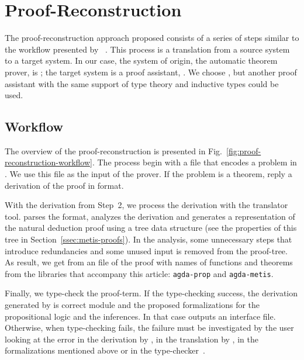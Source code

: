 \documentclass[../main.tex]{subfiles}
\begin{document}

\section{Proof-Reconstruction}
\label{sec:proof-reconstruction}

The proof-reconstruction approach proposed consists of a series
of steps similar to the workflow presented by
\citeauthor{sultana2015}~\cite{sultana2015}.
This process is a translation from a source
system to a target system. In our case, the system of origin, the
automatic theorem prover, is \Metis; the target system is a proof
assistant, \Agda. We choose \Agda, but another proof assistant with the
same support of type theory and inductive types could be used.

\subsection{Workflow}
\label{ssec:workflow}


The overview of the proof-reconstruction is presented in
Fig.~\ref{fig:proof-reconstruction-workflow}. The process begin with
a \TPTP file that encodes a problem in \CPL. We use this file as the
input of the \Metis prover. If the problem is a theorem, \Metis
reply a derivation of the proof in \TSTP format.

With the \TSTP derivation from Step~2, we process the derivation with the
\Athena translator tool.
\Athena parses the \TSTP format, analyzes the
derivation and generates a representation of the natural deduction
proof using a tree data structure (see the properties
of this tree in Section~\ref{ssec:metis-proofs}).
In the \Athena analysis, some unnecessary steps that introduce redundancies
and some unused input is removed from the proof-tree.
As result, we get from \Athena an \Agda file of the proof
with names of functions and theorems from
the \Agda libraries that accompany this article:
\texttt{agda-prop} and \texttt{agda-metis}.

Finally, we type-check the \Agda proof-term. If the type-checking
success, the \TSTP derivation generated by \Metis is correct
module \Agda and the proposed formalizations for the
propositional logic and the \Metis inferences.
In that case \Agda outputs an interface file.
Otherwise, when type-checking fails, the failure must be
investigated by the user looking at the error in the \TSTP derivation
by \Metis, in the translation by \Athena, in the \Agda formalizations
mentioned above or in the type-checker~\Agda.
\end{document}
